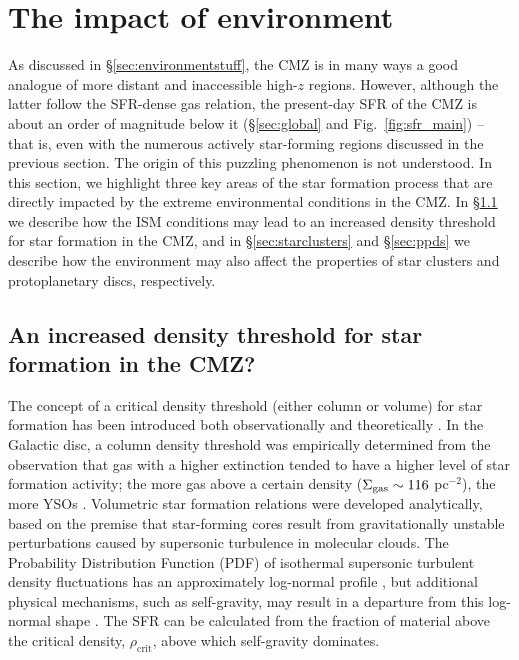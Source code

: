 \section{The impact of environment}
\label{sec:environmentofstarformation}
As discussed in \S\ref{sec:environmentstuff}, the CMZ is in many ways a good analogue of more distant and inaccessible high-$z$ regions. However, although the latter follow the SFR-dense gas relation, the present-day SFR of the CMZ is about an order of magnitude below it (\S\ref{sec:global} and Fig.~\ref{fig:sfr_main}) -- that is, even with the numerous actively star-forming regions discussed in the previous section. The origin of this puzzling phenomenon is not understood. In this section, we highlight three key areas of the star formation process that are directly impacted by the extreme environmental conditions in the CMZ. In \S\ref{sec:sfthreshold} we describe how the ISM conditions may lead to an increased density threshold for star formation in the CMZ, and in \S\ref{sec:starclusters} and \S\ref{sec:ppds} we describe how the environment may also affect the properties of star clusters and protoplanetary discs, respectively.

\subsection{An increased density threshold for star formation in the CMZ?} 
\label{sec:sfthreshold}
The concept of a critical density threshold (either column or volume) for star formation has been introduced both observationally \citep{Lada2010, Lada2012, Heiderman2010} and theoretically \citep{Krumholz2005, Hennebelle2011, Hennebelle2013, Federrath2012, Padoan2011, Padoan2014}. In the Galactic disc, a column density threshold was empirically determined from the observation that gas with a higher extinction tended to have a higher level of star formation activity; the more gas above a certain density ($\Sigma_{\rm{gas}} \sim 116$ \msun pc$^{-2}$), the more YSOs \citep[\S\ref{subsec:SFR:context}][]{Lada2010, Lada2012}. 
Volumetric star formation relations were developed analytically, based on the premise that star-forming cores result from gravitationally unstable perturbations caused by supersonic turbulence in molecular clouds.
The Probability Distribution Function (PDF) of isothermal supersonic turbulent density fluctuations has an approximately log-normal profile \citep[e.g.][]{Nordlund1999}, but additional physical mechanisms, such as self-gravity, may result in a departure from this log-normal shape \citep[e.g.][]{Kainulainen2014, Burkhart2019}. The SFR can be calculated from the fraction of material above the critical density, $\rho_\mathrm{crit}$, above which self-gravity dominates.

